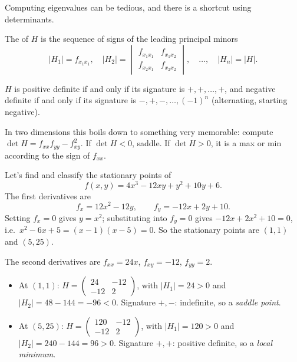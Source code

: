 \documentclass[a4paper]{scrartcl}
\begin{document}
Computing eigenvalues can be tedious, and there is a shortcut using determinants.

\begin{definition}[Signature]
	The  of $H$ is the sequence of signs of the leading principal minors
	$$
	|H_1| = f_{x_1 x_1}, \quad |H_2| = \begin{vmatrix} f_{x_1x_1} & f_{x_1x_2} \\ f_{x_2x_1} & f_{x_2x_2}\end{vmatrix}, \quad \dots, \quad |H_n| = |H|.
	$$
\end{definition}

\begin{proposition}
	$H$ is positive definite if and only if its signature is $+, +, \dots, +$, and negative definite if and only if its signature is $-, +, -, \dots, (-1)^n$ (alternating, starting negative).
\end{proposition}

In two dimensions this boils down to something very memorable: compute $\det H = f_{xx}f_{yy} - f_{xy}^2$. If $\det H < 0$, saddle. If $\det H > 0$, it is a max or min according to the sign of $f_{xx}$.

\begin{example}
	Let's find and classify the stationary points of
	$$
	f(x, y) = 4x^3 - 12xy + y^2 + 10y + 6.
	$$
	The first derivatives are
	$$
	f_x = 12x^2 - 12y, \qquad f_y = -12x + 2y + 10.
	$$
	Setting $f_x = 0$ gives $y = x^2$; substituting into $f_y = 0$ gives $-12x + 2x^2 + 10 = 0$, i.e.\ $x^2 - 6x + 5 = (x - 1)(x - 5) = 0$. So the stationary points are $(1, 1)$ and $(5, 25)$.

	The second derivatives are $f_{xx} = 24x$, $f_{xy} = -12$, $f_{yy} = 2$.
	\begin{itemize}
		\item At $(1, 1)$: $H = \begin{pmatrix} 24 & -12 \\ -12 & 2 \end{pmatrix}$, with $|H_1| = 24 > 0$ and $|H_2| = 48 - 144 = -96 < 0$. Signature $+, -$: indefinite, so a \emph{saddle point}.
		\item At $(5, 25)$: $H = \begin{pmatrix} 120 & -12 \\ -12 & 2\end{pmatrix}$, with $|H_1| = 120 > 0$ and $|H_2| = 240 - 144 = 96 > 0$. Signature $+, +$: positive definite, so a \emph{local minimum}.
	\end{itemize}
\end{example}
\end{document}
